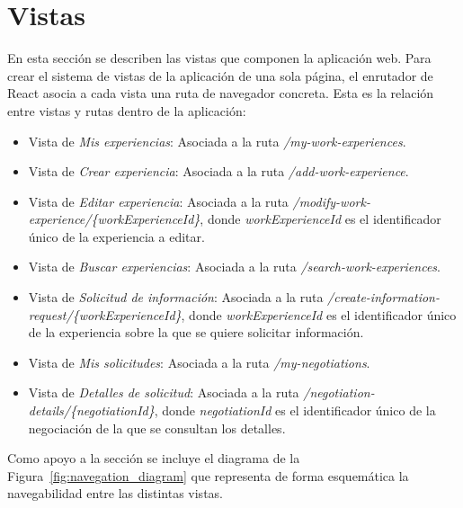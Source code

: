 \documentclass[a4paper, 12pt]{book}
\begin{document}
    \section{Vistas}
    \label{sec:views}
    En esta sección se describen las vistas que componen la aplicación web.
    Para crear el sistema de vistas de la aplicación de una sola página, el enrutador de React asocia a cada vista una ruta de navegador concreta. Esta es la relación entre vistas y rutas dentro de la aplicación:

    \begin{itemize}
        \item Vista de \emph{Mis experiencias}: Asociada a la ruta \emph{/my-work-experiences}.
        \item Vista de \emph{Crear experiencia}: Asociada a la ruta \emph{/add-work-experience}.
        \item Vista de \emph{Editar experiencia}: Asociada a la ruta \emph{/modify-work-experience/\{workExperienceId\}}, donde \emph{workExperienceId} es el identificador único de la experiencia a editar.
        \item Vista de \emph{Buscar experiencias}: Asociada a la ruta \emph{/search-work-experiences}.
        \item Vista de \emph{Solicitud de información}: Asociada a la ruta \emph{/create-information-request/\{workExperienceId\}},
        donde \emph{workExperienceId} es el identificador único de la experiencia sobre la que se quiere solicitar información.
        \item Vista de \emph{Mis solicitudes}: Asociada a la ruta \emph{/my-negotiations}.
        \item Vista de \emph{Detalles de solicitud}: Asociada a la ruta \emph{/negotiation-details/\{negotiationId\}},
        donde \emph{negotiationId} es el identificador único de la negociación de la que se consultan los detalles.
    \end{itemize}

    Como apoyo a la sección se incluye el diagrama de la Figura~\ref{fig:navegation_diagram} que representa de forma esquemática la navegabilidad entre las distintas vistas.
\end{document}
